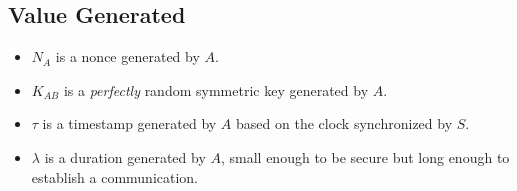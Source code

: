 \subsection{Value Generated}

\begin{itemize}
    \item $N_A$ is a nonce generated by $A$.
    \item $K_{AB}$ is a \textit{perfectly} random symmetric key generated by $A$.
    \item $\tau$ is a timestamp generated by $A$ based on the clock synchronized by $S$.
    \item $\lambda$ is a duration generated by $A$, small enough to be secure but long enough to establish a communication.
\end{itemize}
